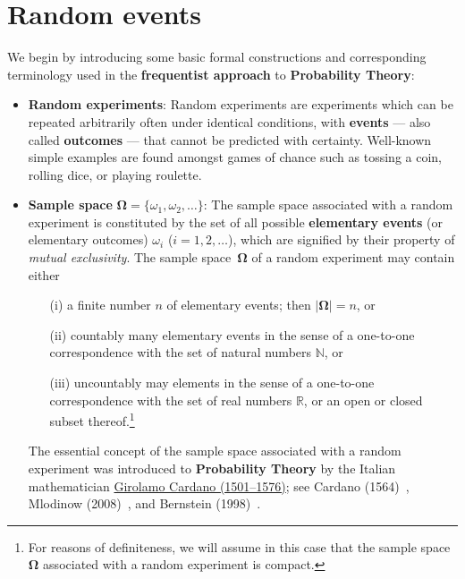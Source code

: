 \section[Random events]{Random events}
We begin by introducing some basic formal constructions and 
corresponding terminology used in the \textbf{frequentist 
approach} to \textbf{Probability Theory}:
%
\begin{itemize}

\item \textbf{Random experiments}: Random experiments are
experiments which can be repeated arbitrarily often under identical 
conditions, with \textbf{events} --- also called \textbf{outcomes}
--- that cannot be predicted with certainty. Well-known simple 
examples are found amongst games of chance such as tossing a coin, 
rolling dice, or playing roulette.

\item \textbf{Sample space} $\boldsymbol{\Omega} =\{\omega_{1},
\omega_{2},\ldots\}$: The sample space associated with a random 
experiment is constituted by the set of all possible
\textbf{elementary events} (or elementary outcomes) $\omega_{i}$
($i=1, 2, \ldots$), which are signified by their property of
\textit{mutual exclusivity}. The sample space~$\boldsymbol{\Omega}$
of a random experiment may contain either
%
\begin{itemize}
\item[(i)] a finite number $n$ of elementary events; then
$|\boldsymbol{\Omega}|=n$, or
\item[(ii)] countably many elementary events in the sense of a 
one-to-one correspondence with the set of natural numbers 
$\mathbb{N}$, or
\item[(iii)] uncountably may elements in the sense of a 
one-to-one correspondence with the set of real numbers 
$\mathbb{R}$, or an open or closed subset thereof.\footnote{For
reasons of definiteness, we will assume in this case
that the sample space $\boldsymbol{\Omega}$ 
associated with a random experiment is compact.}
\end{itemize}
%
The essential concept of the sample space associated with a random 
experiment was introduced to \textbf{Probability Theory} by the 
Italian mathematician 
\href{http://www-history.mcs.st-and.ac.uk/Biographies/Cardan.html}{Girolamo Cardano (1501--1576)}; see Cardano (1564)~, 
Mlodinow (2008)~, and Bernstein 
(1998)~.


\end{itemize}
